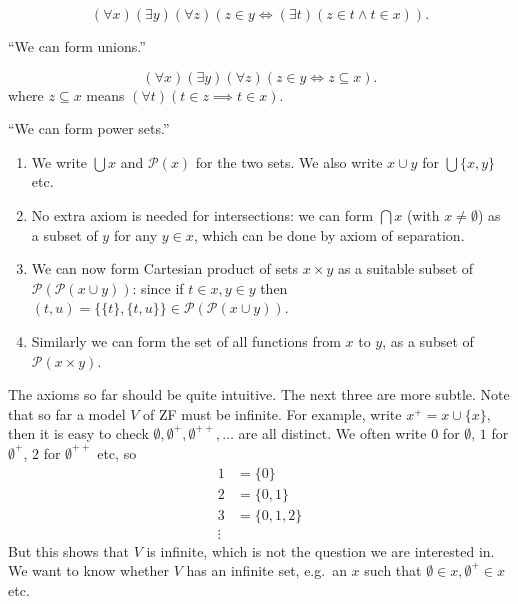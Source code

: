 \documentclass[a4paper]{article}
\begin{document}
\begin{axiom*}
  \[
    (\forall x) (\exists y) (\forall z) (z \in y \iff (\exists t) (z \in t \land t \in x)).
  \]
\end{axiom*}
``We can form unions.''

\begin{axiom*}
  \[
    (\forall x) (\exists y) (\forall z) (z \in y \iff z \subseteq x).
  \]
  where \(z \subseteq x\) means \((\forall t) (t \in z \implies t \in x)\).
\end{axiom*}
``We can form power sets.''

\begin{note}\leavevmode
  \begin{enumerate}
  \item We write \(\bigcup x\) and \(\mathcal P(x)\) for the two sets. We also write \(x \cup y\) for \(\bigcup \{x, y\}\) etc.
  \item No extra axiom is needed for intersections: we can form \(\bigcap x\) (with \(x \neq \emptyset\)) as a subset of \(y\) for any \(y \in x\), which can be done by axiom of separation.
  \item We can now form Cartesian product of sets \(x \times y\) as a suitable subset of \(\mathcal P(\mathcal P(x \cup y))\): since if \(t \in x, y \in y\) then \((t, u) = \{\{t\}, \{t, u\}\} \in \mathcal P(\mathcal P(x \cup y))\).
  \item Similarly we can form the set of all functions from \(x\) to \(y\), as a subset of \(\mathcal P(x \times y)\).
  \end{enumerate}
\end{note}

The axioms so far should be quite intuitive. The next three are more subtle. Note that so far a model \(V\) of ZF must be infinite. For example, write \(x^+ = x \cup \{x\}\), then it is easy to check \(\emptyset, \emptyset^+, \emptyset^{++}, \dots\) are all distinct. We often write \(0\) for \(\emptyset\), \(1\) for \(\emptyset^+\), \(2\) for \(\emptyset^{++}\) etc, so
\begin{align*}
  1 &= \{0\} \\
  2 &= \{0, 1\} \\
  3 &= \{0, 1, 2\} \\
  \vdots
\end{align*}
But this shows that \(V\) is infinite, which is not the question we are interested in. We want to know whether \(V \) has an infinite set, e.g.\ an \(x\) such that \(\emptyset \in x, \emptyset^+ \in x\) etc.
\end{document}
